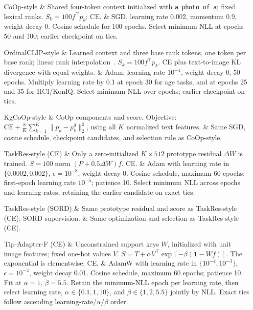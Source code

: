 CoOp-style &
Shared four-token context initialized with \texttt{a photo of a}; fixed lexical ranks.
$S_k=100f^\top p_k$; CE. &
SGD, learning rate 0.002, momentum 0.9, weight decay 0.
Cosine schedule for 100 epochs.
Select minimum NLL at epochs 50 and 100; earlier checkpoint on ties.\\
\addlinespace[2pt]

OrdinalCLIP-style &
Learned context and three base rank tokens, one token per base rank; linear rank interpolation~\cite{li2022ordinalclip}.
$S_k=100f^\top p_k$.
CE plus text-to-image KL divergence with equal weights. &
Adam, learning rate $10^{-4}$, weight decay 0, 50 epochs.
Multiply learning rate by 0.1 at epoch 30 for age tasks, and at epochs 25 and 35 for HCI/KonIQ.
Select minimum NLL over epochs; earlier checkpoint on ties.\\
\addlinespace[2pt]

KgCoOp-style &
CoOp components and score.
Objective:
$\mathrm{CE}+\frac{8}{K}\sum_{k=1}^{K}\|p_k-p_k^0\|_2^2$,
using all $K$ normalized text features. &
Same SGD, cosine schedule, checkpoint candidates, and selection rule as CoOp-style.\\
\addlinespace[2pt]

TaskRes-style (CE) &
Only a zero-initialized $K\times512$ prototype residual $\Delta W$ is trained.
$S=100\operatorname{norm}(P+0.5\Delta W)f$.
CE. &
Adam with learning rate in $\{0.0002,0.002\}$, $\epsilon=10^{-8}$, weight decay 0.
Cosine schedule, maximum 60 epochs; first-epoch learning rate $10^{-5}$; patience 10.
Select minimum NLL across epochs and learning rates, retaining the earlier candidate on exact ties.\\
\addlinespace[2pt]

TaskRes-style (SORD) &
Same prototype residual and score as TaskRes-style (CE); SORD supervision. &
Same optimization and selection as TaskRes-style (CE).\\
\addlinespace[2pt]

Tip-Adapter-F (CE) &
Unconstrained support keys $W$, initialized with unit image features; fixed one-hot values $V$.
$S=T+\alpha V^\top\exp[-\beta(\mathbf1-Wf)]$.
The exponential is elementwise; CE. &
AdamW with learning rate in $\{10^{-4},10^{-3}\}$, $\epsilon=10^{-4}$, weight decay 0.01.
Cosine schedule, maximum 60 epochs; patience 10.
Fit at $\alpha=1$, $\beta=5.5$.
Retain the minimum-NLL epoch per learning rate, then select learning rate,
$\alpha\in\{0.1,1,10\}$, and
$\beta\in\{1,2,5.5\}$ jointly by NLL.
Exact ties follow ascending learning-rate/$\alpha$/$\beta$ order.\\
\addlinespace[2pt]

